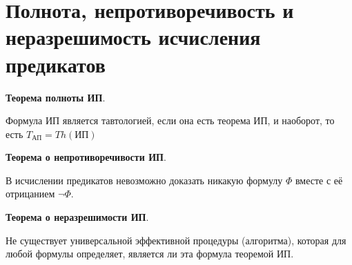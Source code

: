 \section{Полнота, непротиворечивость и неразрешимость исчисления предикатов}
\textbf{Теорема полноты ИП}.

Формула ИП является тавтологией, если она есть теорема ИП, и наоборот, то есть $T_{\text{АП}} = Th(\text{ИП})$

\textbf{Теорема о непротиворечивости ИП}.

В исчислении предикатов невозможно доказать никакую формулу $\Phi$ вместе с её отрицанием $\lnot \Phi$.

\textbf{Теорема о неразрешимости ИП}.

Не существует универсальной эффективной процедуры (алгоритма), которая для любой формулы определяет, является ли эта формула теоремой ИП.